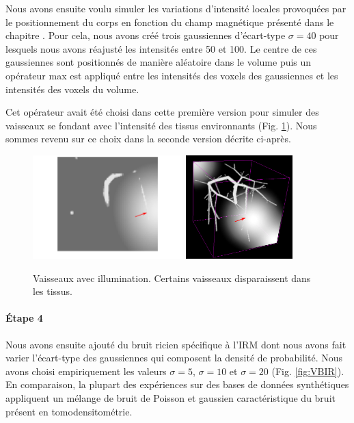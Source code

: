 Nous avons ensuite voulu simuler les variations d'intensité locales provoquées par le positionnement du corps en fonction du champ magnétique présenté dans le chapitre \chapContextN{}. Pour cela, nous avons créé trois gaussiennes d'écart-type $\sigma=40$ pour lesquels nous avons réajusté les intensités entre 50 et 100. Le centre de ces gaussiennes sont positionnés de manière aléatoire dans le volume puis un opérateur max est appliqué entre les intensités des voxels des gaussiennes et les intensités des voxels du volume.

Cet opérateur avait été choisi dans cette première version pour simuler des vaisseaux se fondant avec l'intensité des tissus environnants (Fig. \ref{fig:VBI}). Nous sommes revenu sur ce choix dans la seconde version décrite ci-après.

\begin{figure}[!ht]
  \centering
  \includegraphics[height=4cm]{Images/2D_VBI.png}
  \includegraphics[height=4cm]{Images/3D_VBI.png}
  
  \caption{Vaisseaux avec illumination. Certains vaisseaux disparaissent dans les tissus.}
  \label{fig:VBI}
\end{figure}

\paragraph{Étape 4}

Nous avons ensuite ajouté du bruit ricien spécifique à l'IRM dont nous avons fait varier l'écart-type des gaussiennes qui composent la densité de probabilité. Nous avons choisi empiriquement les valeurs $\sigma=5$, $\sigma=10$ et $\sigma=20$ (Fig. \ref{fig:VBIR}). En comparaison, la plupart des expériences sur des bases de données synthétiques appliquent un mélange de bruit de Poisson et gaussien caractéristique du bruit présent en tomodensitométrie.

